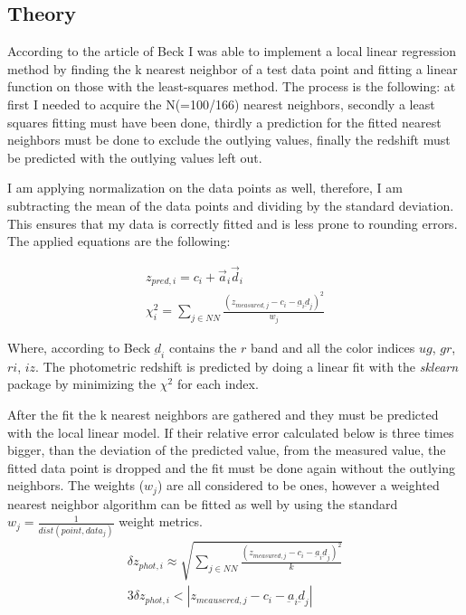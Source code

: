\documentclass[a4paper,12pt]{article}
\begin{document}
\subsection{Theory}

\par According to the article of Beck \cite{beck} I was able to implement a local
linear regression method by finding the k nearest neighbor of a test data point and
fitting a linear function on those with the least-squares method. The process is the
following: at first I needed to acquire the N(=100/166) nearest neighbors, secondly
a least squares fitting must have been done, thirdly a prediction for the fitted nearest
neighbors must be done to exclude the outlying values, finally the redshift must be
predicted with the outlying values left out.

\par I am applying normalization on the data points as well, therefore, I am subtracting
the mean of the data points and dividing by the standard deviation. This ensures that
my data is correctly fitted and is less prone to rounding errors. The applied
equations are the following:

\begin{align}
	z_{pred, i} = c_{i} + \vec{a}_{i}\vec{d}_{i} \\
	\chi_{i}^{2} = \sum_{j \in NN} \frac{(z_{measured, j} - c_{i} - \underbar{a}_{i}\underbar{d}_{j})^{2}}{w_{j}}
\end{align}

\par Where, according to Beck $\underbar{d}_{i}$ contains the $r$ band and all the color
indices $ug$, $gr$, $ri$, $iz$. The photometric redshift is predicted by doing a linear
fit with the \textit{sklearn} package by minimizing the $\chi^{2}$ for each index.

\par After the fit the k nearest neighbors are gathered and they must be predicted with
the local linear model. If their relative error calculated below is three times bigger, than
the deviation of the predicted value, from the measured value, the fitted data point is
dropped and the fit must be done again without the outlying neighbors. The weights ($w_{j}$)
are all considered to be ones, however a weighted nearest neighbor algorithm can be fitted as
well by using the standard $w_{j} = \frac{1}{dist(point, data_{j})}$ weight metrics.
\begin{align}
	\delta z_{phot, i} \approx \sqrt{\sum_{j \in NN} \frac{(z_{measured, j} - c_{i} - \underbar{a}_{i}\underbar{d}_{j})^{2}}{k}} \\
	3\delta z_{phot, i} < |z_{meausered, j} - c_{i} - \underbar{a}_{i}\underbar{d}_{j}|
\end{align}
\end{document}
